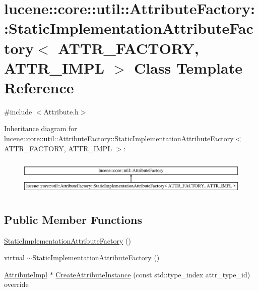 \hypertarget{classlucene_1_1core_1_1util_1_1AttributeFactory_1_1StaticImplementationAttributeFactory}{}\section{lucene\+:\+:core\+:\+:util\+:\+:Attribute\+Factory\+:\+:Static\+Implementation\+Attribute\+Factory$<$ A\+T\+T\+R\+\_\+\+F\+A\+C\+T\+O\+RY, A\+T\+T\+R\+\_\+\+I\+M\+PL $>$ Class Template Reference}
\label{classlucene_1_1core_1_1util_1_1AttributeFactory_1_1StaticImplementationAttributeFactory}


{\ttfamily \#include $<$Attribute.\+h$>$}

Inheritance diagram for lucene\+:\+:core\+:\+:util\+:\+:Attribute\+Factory\+:\+:Static\+Implementation\+Attribute\+Factory$<$ A\+T\+T\+R\+\_\+\+F\+A\+C\+T\+O\+RY, A\+T\+T\+R\+\_\+\+I\+M\+PL $>$\+:\begin{figure}[H]
\begin{center}
\leavevmode
\includegraphics[height=1.815235cm]{classlucene_1_1core_1_1util_1_1AttributeFactory_1_1StaticImplementationAttributeFactory}
\end{center}
\end{figure}
\subsection*{Public Member Functions}
\begin{DoxyCompactItemize}
\item 
\mbox{\hyperlink{classlucene_1_1core_1_1util_1_1AttributeFactory_1_1StaticImplementationAttributeFactory_aed1692d943f8a70e46a85a739743ae94}{Static\+Implementation\+Attribute\+Factory}} ()
\item 
virtual \mbox{\hyperlink{classlucene_1_1core_1_1util_1_1AttributeFactory_1_1StaticImplementationAttributeFactory_a5f8394a6ae54e7aed546e0b8f40ce400}{$\sim$\+Static\+Implementation\+Attribute\+Factory}} ()
\item 
\mbox{\hyperlink{classlucene_1_1core_1_1util_1_1AttributeImpl}{Attribute\+Impl}} $\ast$ \mbox{\hyperlink{classlucene_1_1core_1_1util_1_1AttributeFactory_1_1StaticImplementationAttributeFactory_a06466469f2cf37e0ef599e617d415c6a}{Create\+Attribute\+Instance}} (const std\+::type\+\_\+index attr\+\_\+type\+\_\+id) override
\end{DoxyCompactItemize}
